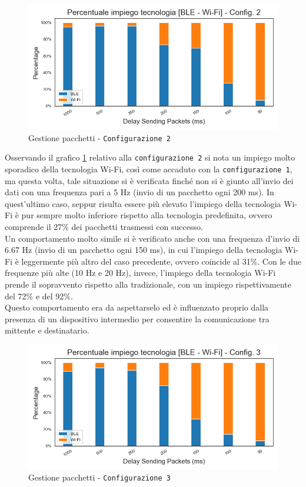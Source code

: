 \begin{figure}[hbt!]
    \centering
    \includegraphics[width = 1\textwidth]{images/graphs/myplot_config_2_title_n.png}
    \caption{Gestione pacchetti - \texttt{Configurazione 2}}
    \label{graph:mixed_conf_2}
\end{figure}

\noindent Osservando il grafico \ref{graph:mixed_conf_2} relativo alla \texttt{configurazione 2} si nota un impiego molto sporadico della tecnologia Wi-Fi, così come accaduto con la \texttt{configurazione 1}, ma questa volta, tale situazione si è verificata finché non si è giunto all'invio dei dati con una frequenza pari a 5 Hz (invio di un pacchetto ogni 200 ms). In quest'ultimo caso, seppur risulta essere più elevato l'impiego della tecnologia Wi-Fi è pur sempre molto inferiore rispetto alla tecnologia predefinita, ovvero comprende il 27\% dei pacchetti trasmessi con successo.\\
Un comportamento molto simile si è verificato anche con una frequenza d'invio di 6.67 Hz (invio di un pacchetto ogni 150 ms), in cui l'impiego della tecnologia Wi-Fi è leggermente più altro del caso precedente, ovvero coincide al 31\%.
Con le due frequenze più alte (10 Hz e 20 Hz), invece, l'impiego della tecnologia Wi-Fi prende il sopravvento rispetto alla tradizionale, con un impiego rispettivamente del 72\% e del 92\%.\\
Questo comportamento era da aspettarselo ed è influenzato proprio dalla presenza di un dispositivo intermedio per consentire la comunicazione tra mittente e destinatario.

\begin{figure}[hbt!]
    \centering
    \includegraphics[width = 1\textwidth]{images/graphs/myplot_config_3_title_n.png}
    \caption{Gestione pacchetti - \texttt{Configurazione 3}}
    \label{graph:mixed_conf_3}
\end{figure}

